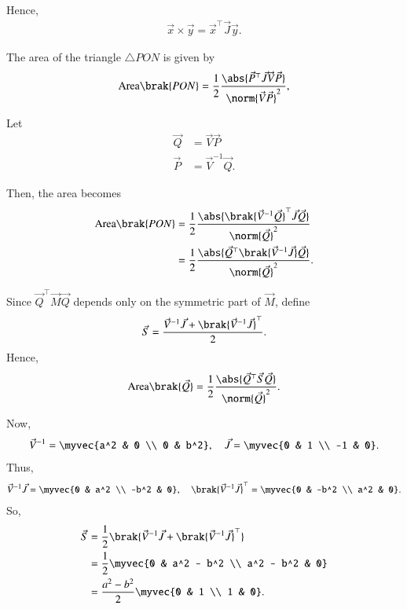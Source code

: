 \documentclass[journal]{IEEEtran}
\begin{document}
Hence,
\begin{align}
    \vec{x} \times \vec{y} = \vec{x}^\top \vec{J} \vec{y}.
\end{align}

The area of the triangle $\triangle PON$ is given by
\begin{align}
    \text{Area}\brak{PON}
    = \frac{1}{2} \frac{\abs{\vec{P}^\top \vec{J} \vec{V} \vec{P}}}{\norm{\vec{V}\vec{P}}^2},
\end{align}

Let
\begin{align}
    \vec{Q} &= \vec{V}\vec{P} \\
    \vec{P} &= \vec{V}^{-1}\vec{Q}.
\end{align}

Then, the area becomes
\begin{align}
    \text{Area}\brak{PON}
    &= \frac{1}{2} \frac{\abs{\brak{\vec{V}^{-1}\vec{Q}}^\top \vec{J} \vec{Q}}}{\norm{\vec{Q}}^2} \\
    &= \frac{1}{2} \frac{\abs{\vec{Q}^\top \brak{\vec{V}^{-1}\vec{J}} \vec{Q}}}{\norm{\vec{Q}}^2}.
\end{align}

Since $\vec{Q}^\top \vec{M} \vec{Q}$ depends only on the symmetric part of $\vec{M}$, define
\begin{align}
    \vec{S} = \frac{\vec{V}^{-1}\vec{J} + \brak{\vec{V}^{-1}\vec{J}}^\top}{2}.
\end{align}
Hence,
\begin{align}
    \text{Area}\brak{\vec{Q}} = \frac{1}{2}\frac{\abs{\vec{Q}^\top \vec{S} \vec{Q}}}{\norm{\vec{Q}}^2}.
\end{align}

Now,
\begin{align}
    \vec{V}^{-1} = \myvec{a^2 & 0 \\ 0 & b^2}, \quad 
    \vec{J} = \myvec{0 & 1 \\ -1 & 0}.
\end{align}
Thus,
\begin{align}
    \vec{V}^{-1}\vec{J} = \myvec{0 & a^2 \\ -b^2 & 0}, \quad
    \brak{\vec{V}^{-1}\vec{J}}^\top = \myvec{0 & -b^2 \\ a^2 & 0}.
\end{align}
So,
\begin{align}
    \vec{S} 
    &= \frac{1}{2}\brak{\vec{V}^{-1}\vec{J} + \brak{\vec{V}^{-1}\vec{J}}^\top} \\
    &= \frac{1}{2}\myvec{0 & a^2 - b^2 \\ a^2 - b^2 & 0} \\
    &= \frac{a^2 - b^2}{2}\myvec{0 & 1 \\ 1 & 0}.
\end{align}
\end{document}
